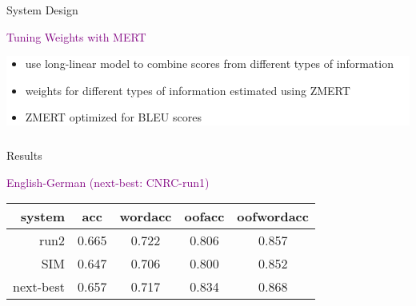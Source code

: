 \documentclass[final,t]{beamer}
\begin{document}
\begin{frame}{}
\begin{columns}[t]
\begin{column}{.55\linewidth}
\begin{block}{System Design}
\begin{center}
  \textcolor{purple}{Tuning Weights with MERT}
\end{center}

  \colorbox{white}{
\begin{minipage}{.90\linewidth}
  \begin{itemize}
  \item use long-linear model to combine scores from different types of information
  \item weights for different types of information estimated using ZMERT
  \item ZMERT optimized for BLEU scores
  \end{itemize}
\end{minipage}
}


\end{block}

    \end{column}
  \end{columns}

\begin{columns}
  \begin{column}{.64\linewidth}

\begin{block}{Results}

\begin{center}
  \textcolor{purple}{English-German (next-best: CNRC-run1)}
  \begin{center}
  \begin{tabular}{|r|c|c|c|c|}
    \hline
    system & acc      & wordacc  & oofacc & oofwordacc \\
    \hline
    run2  &  0.665 & 0.722  &  0.806  & 0.857 \\
    SIM    &  0.647 & 0.706 & 0.800 & 0.852 \\
    next-best     &  0.657   & 0.717   & 0.834 & 0.868    \\
    \hline
  \end{tabular}
  \end{center}


\end{center}
\end{block}
\end{column}
\end{columns}
\end{frame}
\end{document}
